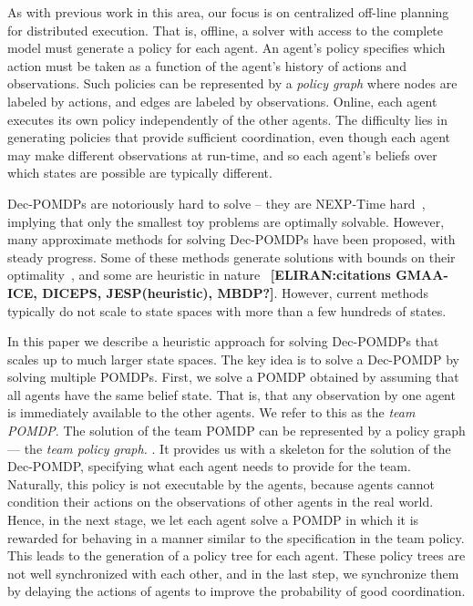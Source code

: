 \documentclass[letterpaper]{article} %
\newcommand{\eliran}[1]{\textbf{[\color{red}ELIRAN:#1]}}
\begin{document}
As with previous work in this area, our focus is on centralized off-line planning for distributed execution. That is, offline, a solver with access to the complete model must generate a policy for each agent. An agent's policy specifies which action must be taken as a function of the agent's history of
actions and observations. Such policies can be represented by a {\em policy graph} where nodes are labeled by actions, and edges are labeled by observations. Online, each agent executes its own policy independently of the other agents.
The difficulty lies in generating policies that provide sufficient coordination, even though each agent may make different observations at run-time, and so each agent's beliefs over which states are possible are typically different. 

Dec-POMDPs are notoriously hard to solve -- they are NEXP-Time hard~\cite{}, implying that only the smallest toy problems are optimally solvable.
However, many approximate methods for solving Dec-POMDPs have been proposed, with steady progress. Some of these methods generate solutions with bounds on
their optimality~\cite{}, and some are heuristic in nature~\cite{} \eliran{citations GMAA-ICE, DICEPS, JESP(heuristic), MBDP?}. However, current methods typically do not scale to state spaces with more than a few hundreds of states.


In this paper we describe a heuristic approach for solving Dec-POMDPs that scales up to much larger state spaces. The key idea is to solve a Dec-POMDP by
solving multiple POMDPs. First, we solve a POMDP obtained by assuming that all agents have the same belief state. That is, that any observation by one agent is immediately available to the other agents. We refer to this as the {\em team POMDP}. The solution of the team
POMDP can be represented by a policy graph --- the {\em team policy graph.} . It provides us with a skeleton for the solution of the Dec-POMDP, specifying what each agent needs to provide for the team. Naturally, this policy is not executable by the agents, because agents cannot condition their actions on the observations of other agents in the real world.
%
Hence, in the next stage, we let each agent solve a POMDP in which it is rewarded for behaving in a manner similar to the specification in the team policy. This leads to the generation of a policy tree for each agent. 
These policy trees are not well synchronized with each other, and in the last step, we synchronize them by delaying the actions of agents to
improve the probability of good coordination. 
\end{document}
